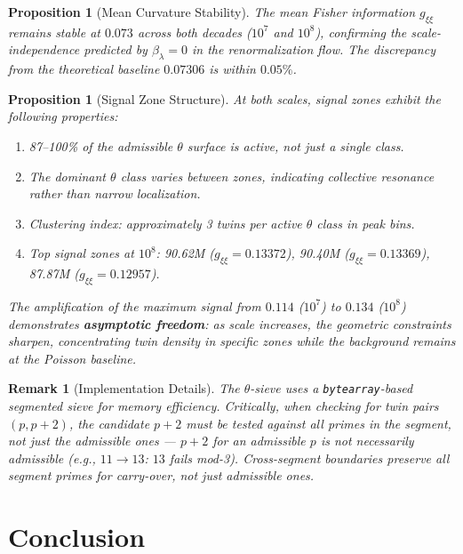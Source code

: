 \documentclass[12pt]{article}
\newtheorem{proposition}[theorem]{Proposition}
\newtheorem{remark}[theorem]{Remark}
\begin{document}
\begin{proposition}[Mean Curvature Stability]
The mean Fisher information $g_{\xi\xi}$ remains stable at $0.073$ across both
decades ($10^7$ and $10^8$), confirming the scale-independence predicted by
$\beta_\lambda = 0$ in the renormalization flow. The discrepancy from the
theoretical baseline $0.07306$ is within $0.05\%$.
\end{proposition}

\begin{proposition}[Signal Zone Structure]
At both scales, signal zones exhibit the following properties:
\begin{enumerate}
  \item 87--100\% of the admissible $\theta$ surface is active, not just a single class.
  \item The dominant $\theta$ class varies between zones, indicating collective
    resonance rather than narrow localization.
  \item Clustering index: approximately 3 twins per active $\theta$ class in peak bins.
  \item Top signal zones at $10^8$: 90.62M ($g_{\xi\xi} = 0.13372$),
    90.40M ($g_{\xi\xi} = 0.13369$), 87.87M ($g_{\xi\xi} = 0.12957$).
\end{enumerate}
The amplification of the maximum signal from $0.114$ ($10^7$) to $0.134$ ($10^8$)
demonstrates \textbf{asymptotic freedom}: as scale increases, the geometric
constraints sharpen, concentrating twin density in specific zones while the
background remains at the Poisson baseline.
\end{proposition}

\begin{remark}[Implementation Details]
The $\theta$-sieve uses a \texttt{bytearray}-based segmented sieve for memory
efficiency. Critically, when checking for twin pairs $(p, p+2)$, the candidate
$p+2$ must be tested against \textit{all} primes in the segment, not just the
admissible ones --- $p+2$ for an admissible $p$ is not necessarily admissible
(e.g., $11 \to 13$: $13$ fails mod-3). Cross-segment boundaries preserve all
segment primes for carry-over, not just admissible ones.
\end{remark}

\section{Conclusion}
\end{document}
